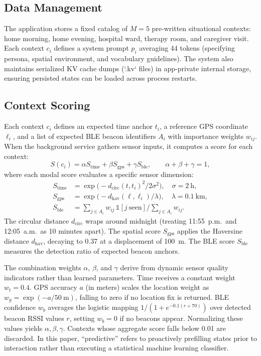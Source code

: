 \documentclass[conference]{IEEEtran}
\begin{document}
\subsection{Data Management}
The application stores a fixed catalog of $M=5$ pre-written situational contexts: home morning, home evening, hospital ward, therapy room, and caregiver visit. Each context $c_i$ defines a system prompt $p_i$ averaging 44 tokens (specifying persona, spatial environment, and vocabulary guidelines). The system also maintains serialized KV cache dumps (`.kv` files) in app-private internal storage, ensuring persisted states can be loaded across process restarts.

\subsection{Context Scoring}
\label{sec:scoring}
Each context $c_i$ defines an expected time anchor $t_i$, a reference GPS coordinate $\ell_i$, and a list of expected BLE beacon identifiers $A_i$ with importance weights $w_{ij}$. When the background service gathers sensor inputs, it computes a score for each context:
\begin{equation}
S(c_i)=\alpha S_{\mathrm{time}}+\beta S_{\mathrm{gps}}+\gamma S_{\mathrm{ble}},\qquad \alpha+\beta+\gamma=1,
\label{eq:score}
\end{equation}
where each modal score evaluates a specific sensor dimension:
\begin{align}
S_{\mathrm{time}}&=\exp\!\bigl(-d_{\mathrm{circ}}(t,t_i)^2/2\sigma^2\bigr),\quad \sigma=2~\mathrm{h},\\
S_{\mathrm{gps}}&=\exp\!\bigl(-d_{\mathrm{hav}}(\ell,\ell_i)/\lambda\bigr),\quad \lambda=0.1~\mathrm{km},\\
S_{\mathrm{ble}}&=\textstyle\sum_{j\in A_i} w_{ij}\,\mathbb{1}[j\ \mathrm{seen}] \big/ \sum_{j\in A_i} w_{ij}.
\end{align}
The circular distance $d_{\mathrm{circ}}$ wraps around midnight (treating 11:55~p.m.\ and 12:05~a.m.\ as 10 minutes apart). The spatial score $S_{\mathrm{gps}}$ applies the Haversine distance $d_{\mathrm{hav}}$, decaying to 0.37 at a displacement of 100~m. The BLE score $S_{\mathrm{ble}}$ measures the detection ratio of expected beacon anchors.

The combination weights $\alpha$, $\beta$, and $\gamma$ derive from dynamic sensor quality indicators rather than learned parameters. Time receives a constant weight $w_t=0.4$. GPS accuracy $a$ (in meters) scales the location weight as $w_g=\exp(-a/50~\mathrm{m})$, falling to zero if no location fix is returned. BLE confidence $w_b$ averages the logistic mapping $1/(1+e^{-0.1(r+70)})$ over detected beacon RSSI values $r$, setting $w_b=0$ if no beacons appear. Normalizing these values yields $\alpha, \beta, \gamma$. Contexts whose aggregate score falls below 0.01 are discarded. In this paper, ``predictive'' refers to proactively prefilling states prior to interaction rather than executing a statistical machine learning classifier.
\end{document}
